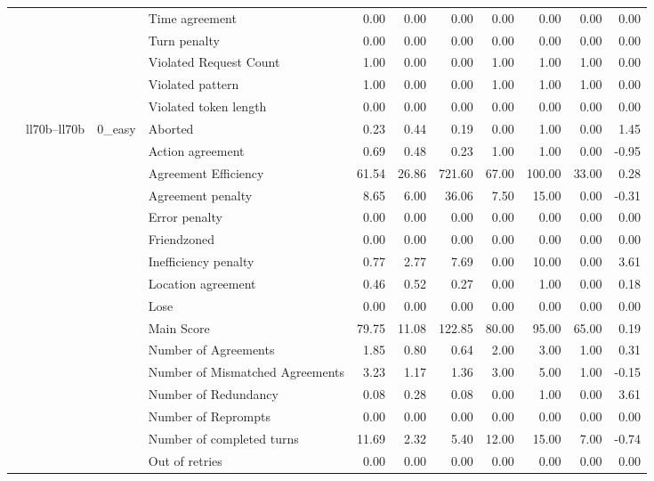 \begin{tabular}{llllrrrrrrr}
 &  &  & Time agreement & 0.00 & 0.00 & 0.00 & 0.00 & 0.00 & 0.00 & 0.00 \\
 &  &  & Turn penalty & 0.00 & 0.00 & 0.00 & 0.00 & 0.00 & 0.00 & 0.00 \\
 &  &  & Violated Request Count & 1.00 & 0.00 & 0.00 & 1.00 & 1.00 & 1.00 & 0.00 \\
 &  &  & Violated pattern & 1.00 & 0.00 & 0.00 & 1.00 & 1.00 & 1.00 & 0.00 \\
 &  &  & Violated token length & 0.00 & 0.00 & 0.00 & 0.00 & 0.00 & 0.00 & 0.00 \\
\cline{2-11} \cline{3-11}
 & \multirow[t]{378}{*}{ll70b--ll70b} & \multirow[t]{27}{*}{0_easy} & Aborted & 0.23 & 0.44 & 0.19 & 0.00 & 1.00 & 0.00 & 1.45 \\
 &  &  & Action agreement & 0.69 & 0.48 & 0.23 & 1.00 & 1.00 & 0.00 & -0.95 \\
 &  &  & Agreement Efficiency & 61.54 & 26.86 & 721.60 & 67.00 & 100.00 & 33.00 & 0.28 \\
 &  &  & Agreement penalty & 8.65 & 6.00 & 36.06 & 7.50 & 15.00 & 0.00 & -0.31 \\
 &  &  & Error penalty & 0.00 & 0.00 & 0.00 & 0.00 & 0.00 & 0.00 & 0.00 \\
 &  &  & Friendzoned & 0.00 & 0.00 & 0.00 & 0.00 & 0.00 & 0.00 & 0.00 \\
 &  &  & Inefficiency penalty & 0.77 & 2.77 & 7.69 & 0.00 & 10.00 & 0.00 & 3.61 \\
 &  &  & Location agreement & 0.46 & 0.52 & 0.27 & 0.00 & 1.00 & 0.00 & 0.18 \\
 &  &  & Lose & 0.00 & 0.00 & 0.00 & 0.00 & 0.00 & 0.00 & 0.00 \\
 &  &  & Main Score & 79.75 & 11.08 & 122.85 & 80.00 & 95.00 & 65.00 & 0.19 \\
 &  &  & Number of Agreements & 1.85 & 0.80 & 0.64 & 2.00 & 3.00 & 1.00 & 0.31 \\
 &  &  & Number of Mismatched Agreements & 3.23 & 1.17 & 1.36 & 3.00 & 5.00 & 1.00 & -0.15 \\
 &  &  & Number of Redundancy & 0.08 & 0.28 & 0.08 & 0.00 & 1.00 & 0.00 & 3.61 \\
 &  &  & Number of Reprompts & 0.00 & 0.00 & 0.00 & 0.00 & 0.00 & 0.00 & 0.00 \\
 &  &  & Number of completed turns & 11.69 & 2.32 & 5.40 & 12.00 & 15.00 & 7.00 & -0.74 \\
 &  &  & Out of retries & 0.00 & 0.00 & 0.00 & 0.00 & 0.00 & 0.00 & 0.00 \\

\end{tabular}
